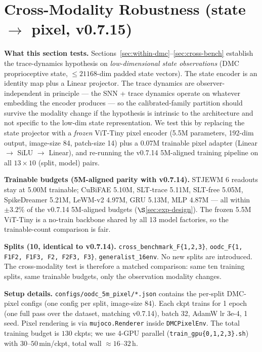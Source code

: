 \documentclass{article}
\begin{document}
\section{Cross-Modality Robustness (state $\to$ pixel, v0.7.15)}

\textbf{What this section tests.} Sections~\ref{sec:within-dmc}--\ref{sec:cross-bench} establish
the trace-dynamics hypothesis on \emph{low-dimensional state observations} (DMC proprioceptive state, $\le 21168$-dim padded state vectors).
The state encoder is an identity map plus a Linear projector. The trace dynamics are
observer-independent in principle --- the SNN + trace dynamics operate on whatever
embedding the encoder produces --- so the calibrated-family partition should survive
the modality change if the hypothesis is intrinsic to the architecture and not
specific to the low-dim state representation. We test this by replacing the
state projector with a \emph{frozen} ViT-Tiny pixel encoder (5.5M parameters, 192-dim
output, image-size 84, patch-size 14) plus a 0.07M trainable pixel adapter
(Linear $\to$ SiLU $\to$ Linear), and re-running the v0.7.14 5M-aligned training
pipeline on all $13 \times 10$ (split, model) pairs.

\textbf{Trainable budgets (5M-aligned parity with v0.7.14).} STJEWM 6 readouts
stay at 5.00M trainable; CuBiFAE 5.10M, SLT-trace 5.11M, SLT-free 5.05M,
SpikeDreamer 5.21M, LeWM-v2 4.97M, GRU 5.13M, MLP 4.87M --- all within
$\pm 3.2\%$ of the v0.7.14 5M-aligned budgets ($\S$\ref{sec:exp-design}). The
frozen 5.5M ViT-Tiny is a no-train backbone shared by all 13 model
factories, so the trainable-count comparison is fair.

\textbf{Splits (10, identical to v0.7.14).} \texttt{cross\_benchmark\_F\{1,2,3\}},
\texttt{oodc\_F\{1, F1F2, F1F3, F2, F2F3, F3\}}, \texttt{generalist\_16env}.
No new splits are introduced. The cross-modality test is therefore a
matched comparison: same ten training splits, same trainable budgets,
only the observation modality changes.

\textbf{Setup details.} \texttt{configs/oodc\_5m\_pixel/*.json}
contains the per-split DMC-pixel configs (one config per split, image-size 84).
Each ckpt trains for 1 epoch (one full pass over the dataset, matching v0.7.14),
batch 32, AdamW lr 3e-4, 1 seed. Pixel rendering is via
\texttt{mujoco.Renderer} inside \texttt{DMCPixelEnv}. The total training budget
is $130$ ckpts; we use 4-GPU parallel (\texttt{train\_gpu\{0,1,2,3\}.sh}) with
$30$--$50\,$min/ckpt, total wall $\approx 16$--$32\,$h.
\end{document}

